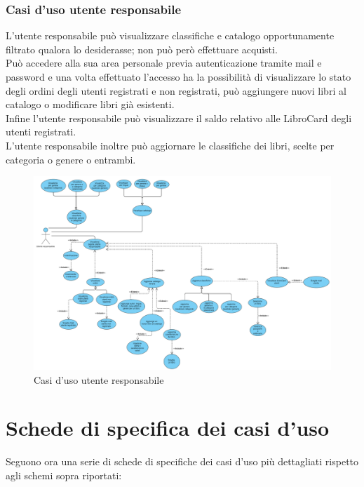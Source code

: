 \documentclass[a4paper,11pt]{report}
\begin{document}
\subsection{Casi d'uso utente responsabile}
L'utente responsabile può visualizzare classifiche e catalogo opportunamente filtrato qualora lo desiderasse; non può però effettuare acquisti.\\
Può accedere alla sua area personale previa autenticazione tramite mail e password e una volta effettuato l'accesso ha la possibilità di visualizzare lo stato degli ordini degli utenti registrati e non registrati, può aggiungere nuovi libri al catalogo o modificare libri già esistenti.\\
Infine l'utente responsabile può visualizzare il saldo relativo alle LibroCard degli utenti registrati.\\
L'utente responsabile inoltre può aggiornare le classifiche dei libri, scelte per categoria o genere o entrambi.\\
\vspace{2cm}

    \begin{figure}[h!]
    	\centering
    	\includegraphics[width=1.2\linewidth]{Use cases diagrams/manager.png}
    	\caption{Casi d'uso utente responsabile}
    \end{figure}

\clearpage
\chapter{Schede di specifica dei casi d'uso}\label{spec casi d'uso}
Seguono ora una serie di schede di specifiche dei casi d'uso più dettagliati rispetto agli schemi sopra riportati:
\end{document}
